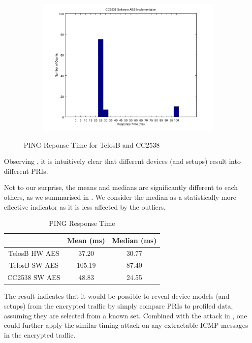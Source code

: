 \begin{figure}[ht!]
\begin{subfigure}{0.4\textwidth}
{		\includegraphics[width=\textwidth]{fig/noncoresec_ping_cc2538_sw.png}
	}
	\end{subfigure}
	\caption{PING Reponse Time for TelosB and CC2538\label{PINGTiming}}
\end{figure}

Observing , it is intuitively clear that different devices (and setups) result into different PRIs. 

Not to our surprise, the means and medians are significantly different to each others, as we summarised in . We consider the median as a statistically more effective indicator as it is less affected by the outliers. 

\begin{table}[ht!]
	\centering
	{
		\begin{tabular}{|c|c|c|}
			\hline
			              & Mean (ms)     & Median (ms)   \\ \hline
			TelosB HW AES & 37.20 & 30.77 \\ \hline
			TelosB SW AES & 105.19        & 87.40          \\ \hline
			CC2538 SW AES & 48.83         & 24.55          \\ \hline
		\end{tabular}
	}
	\caption{PING Response Time}
	\label{PINGResponseTimeTbl}
\end{table}

The result indicates that it would be possible to reveal device models (and setups) from the encrypted traffic by simply compare PRIs to profiled data, assuming they are selected from a known set. Combined with the attack in , one could further apply the similar timing attack on any extractable ICMP messages in the encrypted traffic.